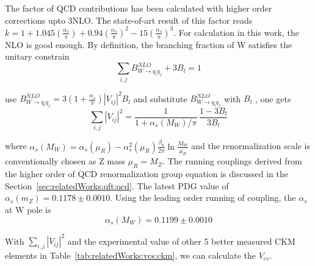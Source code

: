 \noindent The factor of QCD contributions has been calculated with higher order corrections upto 3NLO. The state-of-art result of this factor reads $k = 1+1.045 ( \frac{\alpha_s}{\pi} ) + 0.94  ( \frac{\alpha_s}{\pi} ) ^2 -15  ( \frac{\alpha_s}{\pi} ) ^3$. For calculation in this work, the NLO is good enough. By definition, the branching fraction of W satisfies the unitary constrain
\begin{equation}
    \sum_{ i,j } B_{W \to q_i q_j}^{NLO} + 3 B_l = 1
\end{equation}

\noindent use  $B_{W \to q_i q_j}^{NLO} = 3 (1+\frac{\alpha_s}{\pi}) |V_{ij}|^2 B_l $ and substitute $B_{W \to q_i q_j}^{NLO}$  with $B_l$ , one gets
\begin{equation}
    \sum_{ i,j } |V_{ij}|^2 = \frac{1}{ 1+ \alpha_s(M_W)/\pi } \, \frac{1-3B_l}{3B_l}
\end{equation}

\noindent where $\alpha_s(M_W) = \alpha_s(\mu_R) - \alpha^2_s(\mu_R) \frac{ \beta_0}{2\pi} \ln \frac{M_W}{\mu_R}$ and the renormalization scale is conventionally chosen as Z mass $\mu_R=M_Z$. The running couplings derived from the higher order of QCD renormalization group equation is discussed in the Section~\ref{sec:relatedWorks:qft:qcd}. The latest PDG value of $\alpha_s(m_Z)=0.1178\pm0.0010$. Using the leading order running of coupling, the $\alpha_s$ at W pole is
\begin{equation}
	\alpha_s(M_W) = 0.1199 \pm 0.0010
\end{equation}

\noindent  With $\sum_{ i,j } |V_{ij}|^2$ and the experimental value of other 5 better measured CKM elements \cite{pdg2020} in Table~\ref{tab:relatedWorks:vcs:ckm}, we can calculate the $V_{cs}$.



